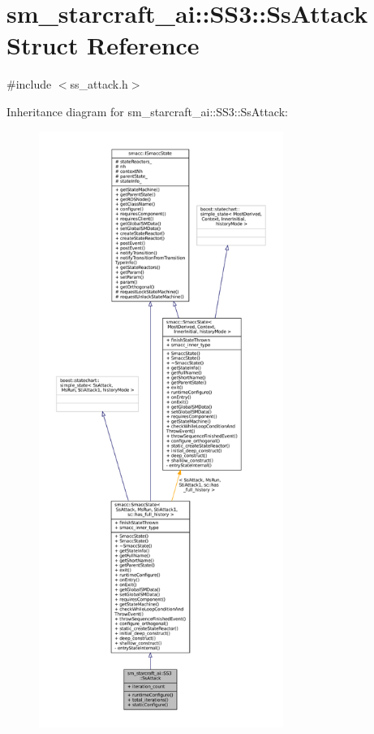 \hypertarget{structsm__starcraft__ai_1_1SS3_1_1SsAttack}{}\section{sm\+\_\+starcraft\+\_\+ai\+:\+:S\+S3\+:\+:Ss\+Attack Struct Reference}
\label{structsm__starcraft__ai_1_1SS3_1_1SsAttack}


{\ttfamily \#include $<$ss\+\_\+attack.\+h$>$}



Inheritance diagram for sm\+\_\+starcraft\+\_\+ai\+:\+:S\+S3\+:\+:Ss\+Attack\+:
\nopagebreak
\begin{figure}[H]
\begin{center}
\leavevmode
\includegraphics[height=550pt]{structsm__starcraft__ai_1_1SS3_1_1SsAttack__inherit__graph}
\end{center}
\end{figure}


